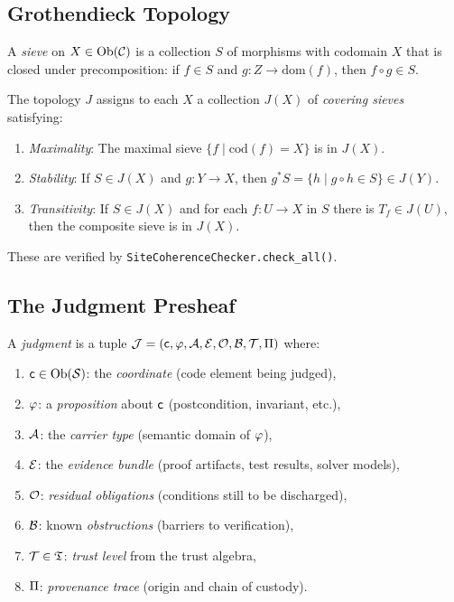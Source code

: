 \subsection{Grothendieck Topology}\label{subsec:topology}

\begin{definition}
A \emph{sieve} on $X \in \mathrm{Ob}(\mathcal{C})$ is a collection $S$ of
morphisms with codomain $X$ that is closed under precomposition:
if $f \in S$ and $g: Z \to \mathrm{dom}(f)$, then $f \circ g \in S$.
\end{definition}

\begin{definition}
The topology $J$ assigns to each $X$ a collection $J(X)$ of \emph{covering
sieves} satisfying:
\begin{enumerate}
  \item \emph{Maximality}: The maximal sieve $\{f \mid \mathrm{cod}(f) = X\}$
        is in $J(X)$.
  \item \emph{Stability}: If $S \in J(X)$ and $g: Y \to X$, then
        $g^*S = \{h \mid g \circ h \in S\} \in J(Y)$.
  \item \emph{Transitivity}: If $S \in J(X)$ and for each $f: U \to X$ in $S$
        there is $T_f \in J(U)$, then the composite sieve is in $J(X)$.
\end{enumerate}
These are verified by \texttt{SiteCoherenceChecker.check\_all()}.
\end{definition}

\subsection{The Judgment Presheaf}\label{subsec:presheaf}

\begin{definition}\label{def:judgment}
A \emph{judgment} is a tuple
$\mathcal{J} = (\mathsf{c}, \varphi, \mathcal{A}, \mathcal{E}, \mathcal{O}, \mathcal{B}, \mathcal{T}, \Pi)$ where:
\begin{enumerate}
  \item $\mathsf{c} \in \mathrm{Ob}(\mathcal{S})$: the \emph{coordinate} (code element being judged),
  \item $\varphi$: a \emph{proposition} about $\mathsf{c}$ (postcondition, invariant, etc.),
  \item $\mathcal{A}$: the \emph{carrier type} (semantic domain of $\varphi$),
  \item $\mathcal{E}$: the \emph{evidence bundle} (proof artifacts, test results, solver models),
  \item $\mathcal{O}$: \emph{residual obligations} (conditions still to be discharged),
  \item $\mathcal{B}$: known \emph{obstructions} (barriers to verification),
  \item $\mathcal{T} \in \mathfrak{T}$: \emph{trust level} from the trust algebra,
  \item $\Pi$: \emph{provenance trace} (origin and chain of custody).
\end{enumerate}
\end{definition}

